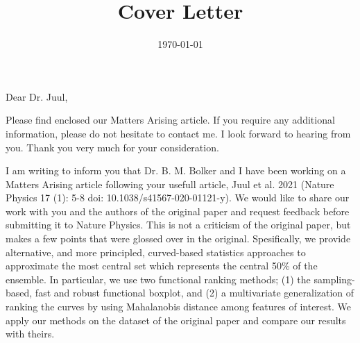 \documentclass[11pt,a4paper,roman]{moderncv}
\title{Cover Letter}
\begin{document}
\date{\today}
\opening{Dear Dr. Juul,}

\closing{Please find enclosed our Matters Arising article. If you require any additional information, please do not hesitate to contact me. I look forward to hearing from you.
Thank you very much for your consideration.}

\makelettertitle

I am writing to inform you that Dr. B. M. Bolker and I have been working on a Matters Arising article following your usefull article, Juul et al. 2021 (Nature Physics 17 (1): 5-8 doi: 10.1038/s41567-020-01121-y).
We would like to share our work with you and the authors of the original paper and request feedback before submitting it to Nature Physics.
This is not a criticism of the original paper, but makes a few points that were glossed over in the original. Spesifically, 
we provide alternative, and more principled, curved-based statistics approaches to approximate the most central set which represents the central 50\% of the ensemble. In particular, we use two functional ranking methods; (1) the sampling-based, fast and robust functional boxplot, and (2) a multivariate generalization of ranking the curves by using Mahalanobis distance among features of interest. We apply our methods on the dataset of the original paper and compare our results with theirs.

\vspace{0.5cm}
\makeletterclosing
\end{document}
